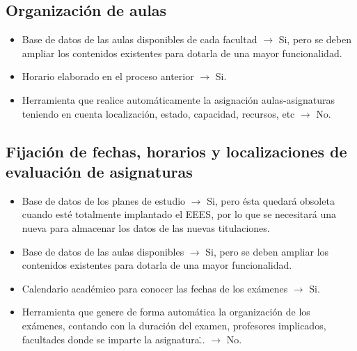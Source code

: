 \documentclass[11pt,a4paper,spanish,twoside]{book}
\begin{document}
\begin{itemize}
\subsection{Organización de aulas}
\begin{itemize}
\item Base de datos de las aulas disponibles de cada facultad $\to$ Si, pero se deben ampliar los contenidos existentes para dotarla de una mayor funcionalidad.
\item Horario elaborado en el proceso anterior $\to$ Si.
\item  Herramienta que realice automáticamente la asignación
    aulas-asignaturas teniendo en cuenta localización, estado, capacidad,
    recursos, etc $\to$ No.
\end{itemize}

\subsection{Fijación de fechas, horarios y localizaciones de evaluación de asignaturas}
\begin{itemize}
\item Base de datos de los planes de estudio $\to$ Si, pero ésta quedará obsoleta cuando esté totalmente implantado el EEES, por lo que se necesitará una nueva para almacenar los datos de las nuevas titulaciones. 
\item Base de datos de las aulas disponibles $\to$ Si, pero se deben ampliar los contenidos existentes para dotarla de una mayor funcionalidad. 
\item Calendario académico para conocer las fechas de los exámenes $\to$ Si.
\item Herramienta que genere de forma automática la organización de los
    exámenes, contando con la duración del examen, profesores implicados,
    facultades donde se imparte la asignatura\... $\to$ No.
\end{itemize}


\end{itemize}
\end{document}
